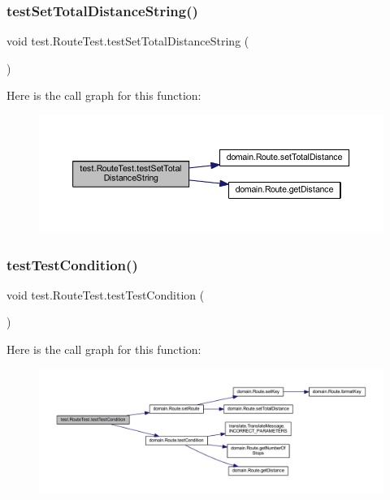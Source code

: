 \subsubsection{\texorpdfstring{test\+Set\+Total\+Distance\+String()}{testSetTotalDistanceString()}}
{\footnotesize\ttfamily void test.\+Route\+Test.\+test\+Set\+Total\+Distance\+String (\begin{DoxyParamCaption}{ }\end{DoxyParamCaption})}

Here is the call graph for this function\+:\nopagebreak
\begin{figure}[H]
\begin{center}
\leavevmode
\includegraphics[width=350pt]{classtest_1_1_route_test_a8e80ff61aae3fce1b14e526b8b09ca40_cgraph}
\end{center}
\end{figure}
\mbox{\label{classtest_1_1_route_test_a9555de1650cfe22c915c127f07c900ab}} 
\subsubsection{\texorpdfstring{test\+Test\+Condition()}{testTestCondition()}}
{\footnotesize\ttfamily void test.\+Route\+Test.\+test\+Test\+Condition (\begin{DoxyParamCaption}{ }\end{DoxyParamCaption})}

Here is the call graph for this function\+:\nopagebreak
\begin{figure}[H]
\begin{center}
\leavevmode
\includegraphics[width=350pt]{classtest_1_1_route_test_a9555de1650cfe22c915c127f07c900ab_cgraph}
\end{center}
\end{figure}


